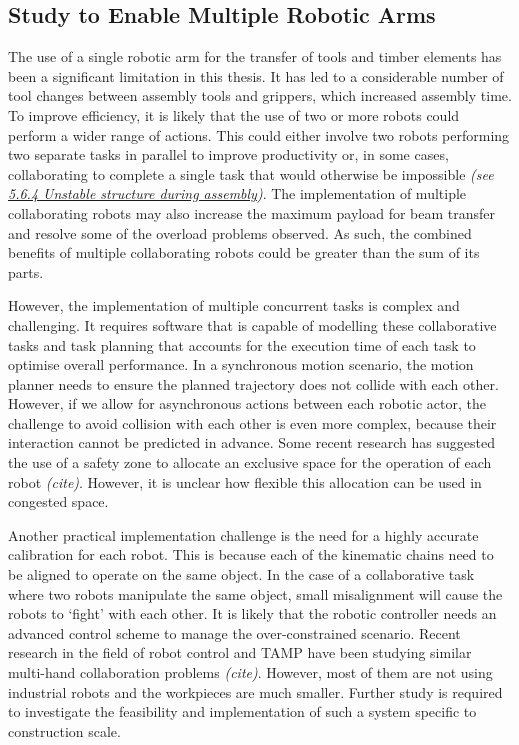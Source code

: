 \subsection{Study to Enable Multiple Robotic Arms}

The use of a single robotic arm for the transfer of tools and timber elements has been a significant limitation in this thesis. It has led to a considerable number of tool changes between assembly tools and grippers, which increased assembly time. To improve efficiency, it is likely that the use of two or more robots could perform a wider range of actions. This could either involve two robots performing two separate tasks in parallel to improve productivity or, in some cases, collaborating to complete a single task that would otherwise be impossible \textit{(see \uline{5.6.4 Unstable structure during assembly})}. The implementation of multiple collaborating robots may also increase the maximum payload for beam transfer and resolve some of the overload problems observed. As such, the combined benefits of multiple collaborating robots could be greater than the sum of its parts.

However, the implementation of multiple concurrent tasks is complex and challenging. It requires software that is capable of modelling these collaborative tasks and task planning that accounts for the execution time of each task to optimise overall performance. In a synchronous motion scenario, the motion planner needs to ensure the planned trajectory does not collide with each other. However, if we allow for asynchronous actions between each robotic actor, the challenge to avoid collision with each other is even more complex, because their interaction cannot be predicted in advance. Some recent research has suggested the use of a safety zone to allocate an exclusive space for the operation of each robot \textit{(cite)}. However, it is unclear how flexible this allocation can be used in congested space.

Another practical implementation challenge is the need for a highly accurate calibration for each robot. This is because each of the kinematic chains need to be aligned to operate on the same object. In the case of a collaborative task where two robots manipulate the same object, small misalignment will cause the robots to ‘fight’ with each other. It is likely that the robotic controller needs an advanced control scheme to manage the over-constrained scenario. Recent research in the field of robot control and TAMP have been studying similar multi-hand collaboration problems \textit{(cite)}. However, most of them are not using industrial robots and the workpieces are much smaller. Further study is required to investigate the feasibility and implementation of such a system specific to construction scale. 

